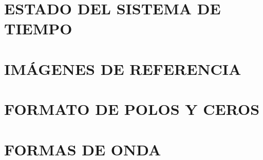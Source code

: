 \documentclass[a4paper, 12pt, final]{article}
\begin{document}
	\section{ESTADO DEL SISTEMA DE TIEMPO}

	\section{IMÁGENES DE REFERENCIA}

	\section{FORMATO DE POLOS Y CEROS}
    \label{sec:formato}

	\section{FORMAS DE ONDA}
    \label{sec:formas}
\end{document}
